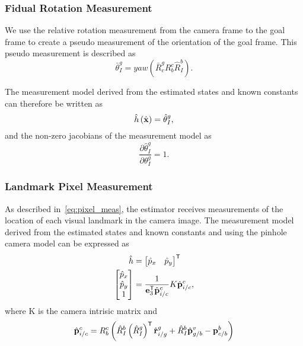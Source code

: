 \subsubsection{Fidual Rotation Measurement}
We use the relative rotation measurement from the camera frame to the goal frame
to create a pseudo measurement of the orientation of the goal frame. This pseudo
measurement is described as
\begin{equation}
  \bar{\theta}_I^g = yaw \left( \bar{R}_c^g R_b^c \hat{R}_I^b \right).
\end{equation}

The measurement model derived from the estimated states and known constants can
therefore be written as
\begin{equation}
  \hat{h} \left( \hat{\boldsymbol{\mathrm{x}}} \right) = \hat{\theta}_I^g,
\end{equation}
and the non-zero jacobians of the measurement model as
\begin{equation}
  \frac{\partial \hat{\theta}_I^g}{\partial \theta_I^g} = 1.
\end{equation}

\subsubsection{Landmark Pixel Measurement}
As described in~\eqref{eq:pixel_meas}, the estimator receives measurements of
the location of each visual landmark in the camera image. The measurement model
derived from the estimated states and known constants and using the pinhole
camera model can be expressed as
\begin{align}
  \hat{h} &=
  \begin{bmatrix}
    \hat{p}_x & \hat{p}_y
  \end{bmatrix}^{\mathsf{T}} \\
  \begin{bmatrix}
    \hat{p}_x \\ \hat{p}_y \\ 1
  \end{bmatrix} &= \frac{1}{\boldsymbol{\mathrm{e}}_3^{\mathsf{T}} \hat{\boldsymbol{\mathrm{p}}}_{i/c}^c} K
  \hat{\boldsymbol{\mathrm{p}}}_{i/c}^c,
\end{align}
where K is the camera intrisic matrix and 
\begin{align}
  \hat{\boldsymbol{\mathrm{p}}}_{i/c}^c = R_b^c \left( \hat{R}_I^b \left( \hat{R}_I^g \right)^{\mathsf{T}}
  \hat{\boldsymbol{\mathrm{r}}}_{i/g}^g + \hat{R}_I^b \hat{\boldsymbol{\mathrm{p}}}_{g/b}^v - \boldsymbol{\mathrm{p}}_{c/b}^b \right)
\end{align}

